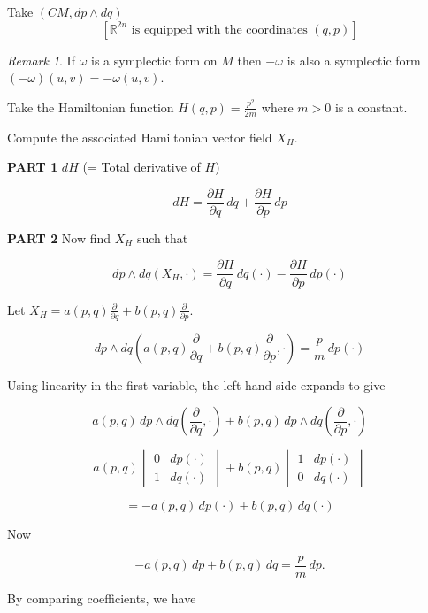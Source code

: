 \documentclass[11pt]{article}
\theoremstyle{definition}
\theoremstyle{remark}
\newtheorem{remark}{Remark}[section]
\begin{document}
Take $(CM, dp \wedge dq)$
\[
\left[ \mathbb{R}^{2n} \text{ is equipped with the coordinates } (q, p) \right]
\]

\begin{remark}\label{rem:symplectic_form}
If $\omega$ is a symplectic form on $M$ then $-\omega$ is also a symplectic form $(-\omega)(u,v) = -\omega(u,v)$.
\end{remark}

Take the Hamiltonian function \( H(q, p) = \frac{p^2}{2m} \) where \( m > 0 \) is a constant.

Compute the associated Hamiltonian vector field \( X_H \).

\textbf{PART 1} $dH$ (= Total derivative of $H$)

\[
dH = \frac{\partial H}{\partial q} \, dq + \frac{\partial H}{\partial p} \, dp
\]

\textbf{PART 2} Now find \( X_H \) such that

\[
dp \wedge dq (X_H, \cdot) = \frac{\partial H}{\partial q} \, dq(\cdot) - \frac{\partial H}{\partial p} \, dp(\cdot)
\]

Let \( X_H = a(p,q) \frac{\partial}{\partial q} + b(p,q) \frac{\partial}{\partial p} \).

\[
dp \wedge dq \left( a(p,q) \frac{\partial}{\partial q} + b(p,q) \frac{\partial}{\partial p}, \cdot \right) = \frac{p}{m} \, dp(\cdot)
\]

Using linearity in the first variable, the left-hand side expands to give

\[
a(p,q) \, dp \wedge dq \left( \frac{\partial}{\partial q}, \cdot \right) + b(p,q) \, dp \wedge dq \left( \frac{\partial}{\partial p}, \cdot \right)
\]

\[
a(p,q) \begin{vmatrix}
0 & dp(\cdot) \\
1 & dq(\cdot)
\end{vmatrix} + b(p,q) \begin{vmatrix}
1 & dp(\cdot) \\
0 & dq(\cdot)
\end{vmatrix}
\]

\[
= -a(p,q)\,dp(\cdot) + b(p,q)\,dq(\cdot)
\]

Now

\[
-a(p,q)\,dp + b(p,q)\,dq = \frac{p}{m}\,dp.
\]

By comparing coefficients, we have
\end{document}
